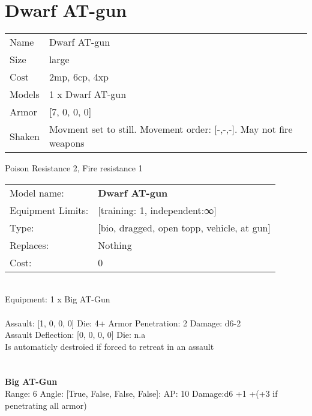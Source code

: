 \pagebreak\pagebreak

\section{ Dwarf AT-gun }

\begin{tabular}{ll}
  Name & Dwarf AT-gun \\
  Size & large\\
  Cost & 2mp, 6cp, 4xp\\
  Models & 1 x Dwarf AT-gun\\
  Armor & [7, 0, 0, 0]\\
  Shaken & Movment set to still. Movement order: [-,-,-]. May not fire weapons\\
\end{tabular}

\noindent Poison Resistance 2, Fire resistance 1\\ 


\noindent
\begin{tabular}{ll}
Model name: &{\bf Dwarf AT-gun } \\
Equipment Limits: &[training: 1, independent:∞] \\
Type: &[bio, dragged, open topp, vehicle, at gun] \\
Replaces: &Nothing \\
Cost: & 0\\
\end{tabular}
\ \\
Equipment: 1 x Big AT-Gun \\
\ \\
Assault: [1, 0, 0, 0] Die: 4+ Armor Penetration: 2 Damage: d6-2 \\
Assault Deflection: [0, 0, 0, 0] Die: n.a\\
\indent Is automaticly destroied if forced to retreat in an assault\\ 
 
\ \\

\ \\
{\bf Big AT-Gun } \\



Range: 6  Angle: [True, False, False, False]: AP: 10 Damage:d6 +1 +(+3 if penetrating all armor) \\




 
\ \\



